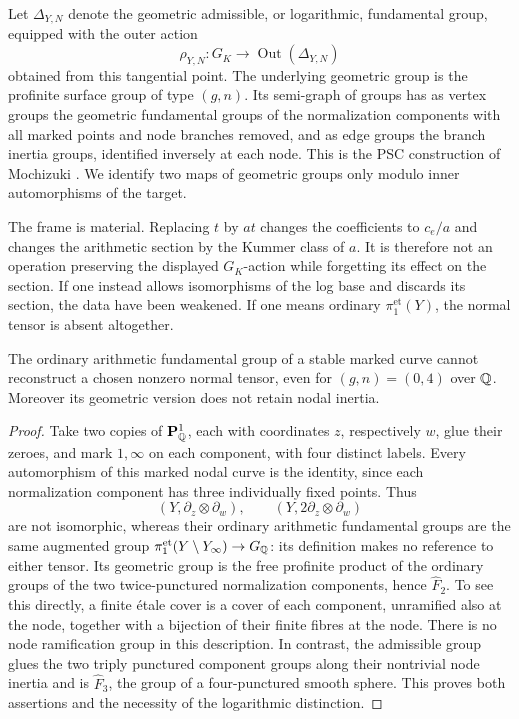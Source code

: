 Let $\Delta_{Y,N}$ denote the geometric admissible, or logarithmic, fundamental group, equipped with the outer action
\[
 \rho_{Y,N}:G_K\longrightarrow\operatorname{Out}(\Delta_{Y,N})
\]
obtained from this tangential point. The underlying geometric group is the profinite surface group of type $(g,n)$. Its semi-graph of groups has as vertex groups the geometric fundamental groups of the normalization components with all marked points and node branches removed, and as edge groups the branch inertia groups, identified inversely at each node. This is the PSC construction of Mochizuki \cite[Definition 1.1 and Example 2.5]{Mochizuki2007A567}. We identify two maps of geometric groups only modulo inner automorphisms of the target.

The frame is material. Replacing $t$ by $a t$ changes the coefficients to $c_e/a$ and changes the arithmetic section by the Kummer class of $a$. It is therefore not an operation preserving the displayed $G_K$-action while forgetting its effect on the section. If one instead allows isomorphisms of the log base and discards its section, the data have been weakened. If one means ordinary $\pi_1^{\mathrm{et}}(Y)$, the normal tensor is absent altogether.

\begin{proposition}\label{A6-ordinary-counterexample}
The ordinary arithmetic fundamental group of a stable marked curve cannot reconstruct a chosen nonzero normal tensor, even for $(g,n)=(0,4)$ over ${\mathbb{Q}}$. Moreover its geometric version does not retain nodal inertia.
\end{proposition}
\begin{proof}
Take two copies of $\mathbf P^1_{\mathbb{Q}}$, each with coordinates $z$, respectively $w$, glue their zeroes, and mark $1,\infty$ on each component, with four distinct labels. Every automorphism of this marked nodal curve is the identity, since each normalization component has three individually fixed points. Thus
\[
 (Y,\partial_z\otimes\partial_w),\qquad
 (Y,2\partial_z\otimes\partial_w)
\]
are not isomorphic, whereas their ordinary arithmetic fundamental groups are the same augmented group $\pi_1^{\mathrm{et}}(Y\setminus Y_\infty)\to G_{\mathbb{Q}}$: its definition makes no reference to either tensor. Its geometric group is the free profinite product of the ordinary groups of the two twice-punctured normalization components, hence $\widehat{F}_2$. To see this directly, a finite étale cover is a cover of each component, unramified also at the node, together with a bijection of their finite fibres at the node. There is no node ramification group in this description. In contrast, the admissible group glues the two triply punctured component groups along their nontrivial node inertia and is $\widehat{F}_3$, the group of a four-punctured smooth sphere. This proves both assertions and the necessity of the logarithmic distinction.
\end{proof}

